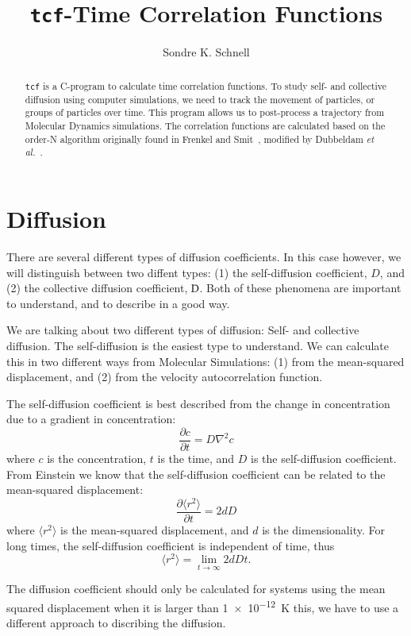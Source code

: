 \documentclass[11pt]{article}
\author{Sondre K. Schnell}
\title{\texttt{tcf}-Time Correlation Functions}
\newcommand{\Dbar}{{\mathchar'26\mkern-11mu\mathrm{D}}}
\begin{document}
\maketitle

\begin{abstract}

\texttt{tcf} is a C-program to calculate time correlation functions.
To study self- and collective diffusion using computer simulations, we
need to track the movement of particles, or groups of particles over
time. This program allows us to post-process a trajectory from Molecular
Dynamics simulations. The correlation functions are calculated based on
the order-N algorithm originally found in Frenkel and
Smit~\cite{fre021}, modified by Dubbeldam \textit{et al.}~\cite{dub091}.

\end{abstract}

\section{Diffusion}
 

There are several different types of diffusion coefficients. In this
case however, we will distinguish between two diffent types: (1) the
self-diffusion coefficient, $D$, and (2) the collective diffusion
coefficient, $\Dbar$. Both of these phenomena are important to
understand, and to describe in a good way. 


We are talking about two different types of diffusion: Self- and
collective diffusion. The self-diffusion is the easiest type to
understand. We can calculate this in two different ways from Molecular
Simulations: (1) from the mean-squared displacement, and (2) from the
velocity autocorrelation function. 

The self-diffusion coefficient is best described from the change in
concentration due to a gradient in concentration:
\begin{equation}
\frac{\partial c}{\partial t} = D \nabla ^2 c
\end{equation}
where $c$ is the concentration, $t$ is the time, and $D$ is the
self-diffusion coefficient. From Einstein we know that the
self-diffusion coefficient can be related to the mean-squared
displacement: 
\begin{equation}
\frac{\partial \langle r^2 \rangle}{\partial t} = 2dD
\end{equation}
where $\langle r^2 \rangle$ is the mean-squared displacement, and $d$ is the
dimensionality. For long times, the self-diffusion coefficient is
independent of time, thus
\begin{equation}
\langle r^2 \rangle = \lim_{t\rightarrow \infty} 2d D t. 
\end{equation}

The diffusion coefficient should only be calculated for systems using
the mean squared displacement when it is larger than
\SI{1e-12}{\kelvin}
this, we have to use a different approach to discribing the diffusion. 






\end{document}
